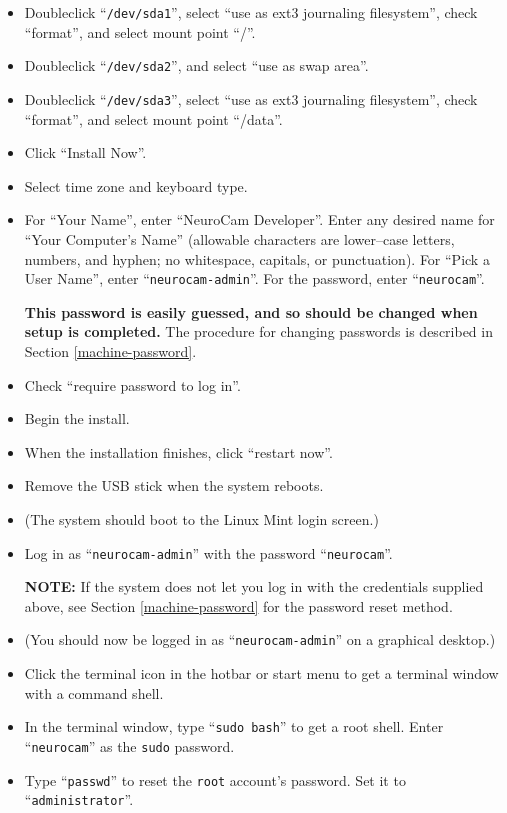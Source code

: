 \begin{itemize}
\item Doubleclick ``\verb+/dev/sda1+'', select ``use as ext3 journaling
filesystem'', check ``format'', and select mount point ``/''.
\item Doubleclick ``\verb+/dev/sda2+'', and select ``use as swap area''.
\item Doubleclick ``\verb+/dev/sda3+'', select ``use as ext3 journaling
filesystem'', check ``format'', and select mount point ``/data''.
\item Click ``Install Now''.
\item Select time zone and keyboard type.
\item For ``Your Name'', enter ``NeuroCam Developer''. Enter any desired
name for ``Your Computer's Name'' (allowable characters are lower--case 
letters, numbers, and hyphen; no whitespace, capitals, or punctuation).
For ``Pick a User Name'', enter ``\verb+neurocam-admin+''. For the password,
enter ``\verb+neurocam+''.
\par
\textbf{This password is easily guessed, and so should be changed when
setup is completed.} The procedure for changing passwords is described in
Section \ref{machine-password}.
\item Check ``require password to log in''.
\item Begin the install.
\item When the installation finishes, click ``restart now''.
\item Remove the USB stick when the system reboots.
%
\item (The system should boot to the Linux Mint login screen.)
\item Log in as ``\verb+neurocam-admin+'' with the password
``\verb+neurocam+''.
\par
\textbf{NOTE:} If the system does not let you log in with the credentials
supplied above, see Section \ref{machine-password} for the password reset
method.
%
\item (You should now be logged in as ``\verb+neurocam-admin+'' on a graphical
desktop.)
\item Click the terminal icon in the hotbar or start menu to get a terminal
window with a command shell.
\item In the terminal window, type ``\verb+sudo bash+'' to get a root shell.
Enter ``\verb+neurocam+'' as the \verb+sudo+ password.
\item Type ``\verb+passwd+'' to reset the \verb+root+ account's password.
Set it to ``\verb+administrator+''.
\par

\end{itemize}
